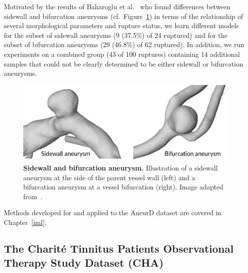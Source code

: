 \documentclass[
  oneside]{book}
\begin{document}
Motivated by the results of Baharoglu et al.~\autocite{BaharogluEtAl:Neurosurgery2012} who found differences between sidewall and bifurcation aneurysms (cf.~Figure~\ref{fig:02-aneurd-sw-bf}) in terms of the relationship of several morphological parameters and rupture status, we learn different models for the subset of sidewall aneurysms (9 (37.5\%) of 24 ruptured) and for the subset of bifurcation aneurysms (29 (46.8\%) of 62 ruptured).
In addition, we run experiments on a combined group (43 of 100 ruptures) containing 14 additional samples that could not be clearly determined to be either sidewall or bifurcation aneurysms.



\begin{figure}[htbp]

{\centering \includegraphics[width=0.67\linewidth]{figures/02-aneurd-sw-bf} 

}

\caption{\textbf{Sidewall and bifurcation aneurysm.} Illustration of a sidewall aneurysm at the side of the parent vessel wall (left) and a bifurcation aneurysm at a vessel bifurcation (right). Image adapted from~\autocite{Niemann:CBMS2018}.}\label{fig:02-aneurd-sw-bf}
\end{figure}

Methods developed for and applied to the AneurD dataset are covered in Chapter~\ref{iml}.

\hypertarget{background-data-cha}{%
\subsection{The Charité Tinnitus Patients Observational Therapy Study Dataset (CHA)}\label{background-data-cha}}
\end{document}
